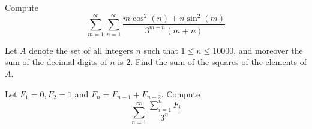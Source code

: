 \documentclass[11pt]{article}
\begin{document}
\begin{prob}[MMATHS 2018]{4}
Compute
$$\sum_{m=1}^{\infty} \sum_{n=1}^{\infty} \frac{m\cos^2(n)+n\sin^2(m)}{3^{m+n}(m+n)}$$
\end{prob}

\begin{prob}{8}
Let $A$ denote the set of all integers $n$ such that $1 \leq n \leq 10000$, and moreover the sum of the decimal digits of $n$ is $2$. Find the sum of the squares of the elements of $A$.
\end{prob}

\begin{prob}[BMT 2018]{14}
Let $F_{1}=0, F_{2}=1$ and $F_{n}=F_{n-1}+F_{n-2}$. Compute
$$\sum_{n=1}^{\infty} \frac{\sum_{i=1}^{n} F_{i}}{3^{n}}$$
\end{prob}
\end{document}
